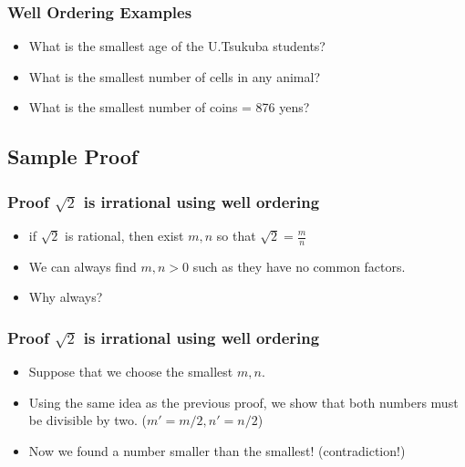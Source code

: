 \begin{frame}
  \frametitle{Well Ordering Examples}
  {\large
    \begin{itemize}
    \item What is the smallest age of the U.Tsukuba students?
    \item What is the smallest number of cells in any animal?
    \item What is the smallest number of coins = 876 yens?
    \end{itemize}
  }
\end{frame}

\subsection{Sample Proof}
\begin{frame}
  \frametitle{Proof $\sqrt{2}$ is irrational using well ordering}

  \begin{itemize}
    \item if $\sqrt{2}$ is rational, then exist $m,n$ so that
      $\sqrt{2} = \frac{m}{n}$
    \item We can always find $m,n > 0$ such as they have no common
      factors.
    \item \alert{Why} always?
  \end{itemize}
\end{frame}

\begin{frame}
  \frametitle{Proof $\sqrt{2}$ is irrational using well ordering}
  \begin{itemize}
  \item Suppose that we choose the \alert{smallest} $m,n$.
    \bigskip

  \item Using the same idea as the previous proof, we show that both
    numbers must be divisible by two. ($m' = m/2, n' = n/2$)
    \bigskip

  \item Now we found a number \alert{smaller than the smallest! (contradiction!)}
  \end{itemize}
\end{frame}

